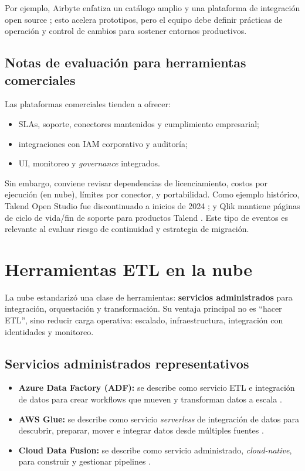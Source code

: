 \documentclass[12pt]{article}
\begin{document}
Por ejemplo, Airbyte enfatiza un catálogo amplio y una plataforma de integración open source \cite{airbyte_docs,airbyte_github}; esto acelera prototipos, pero el equipo debe definir prácticas de operación y control de cambios para sostener entornos productivos.

\subsection{Notas de evaluación para herramientas comerciales}
Las plataformas comerciales tienden a ofrecer:
\begin{itemize}[leftmargin=*]
  \item SLAs, soporte, conectores mantenidos y cumplimiento empresarial;
  \item integraciones con IAM corporativo y auditoría;
  \item UI, monitoreo y \textit{governance} integrados.
\end{itemize}

Sin embargo, conviene revisar dependencias de licenciamiento, costos por ejecución (en nube), límites por conector, y portabilidad. Como ejemplo histórico, Talend Open Studio fue discontinuado a inicios de 2024 \cite{talend_os_discontinued}; y Qlik mantiene páginas de ciclo de vida/fin de soporte para productos Talend \cite{qlik_talend_lifecycle}. Este tipo de eventos es relevante al evaluar riesgo de continuidad y estrategia de migración.

\section{Herramientas ETL en la nube}
La nube estandarizó una clase de herramientas: \textbf{servicios administrados} para integración, orquestación y transformación. Su ventaja principal no es “hacer ETL”, sino reducir carga operativa: escalado, infraestructura, integración con identidades y monitoreo.

\subsection{Servicios administrados representativos}
\begin{itemize}[leftmargin=*]
  \item \textbf{Azure Data Factory (ADF):} se describe como servicio ETL e integración de datos para crear workflows que mueven y transforman datos a escala \cite{ms_adf_intro}.
  \item \textbf{AWS Glue:} se describe como servicio \textit{serverless} de integración de datos para descubrir, preparar, mover e integrar datos desde múltiples fuentes \cite{aws_glue_what}.
  \item \textbf{Cloud Data Fusion:} se describe como servicio administrado, \textit{cloud-native}, para construir y gestionar pipelines \cite{gcp_data_fusion_overview}.
\end{itemize}
\end{document}
